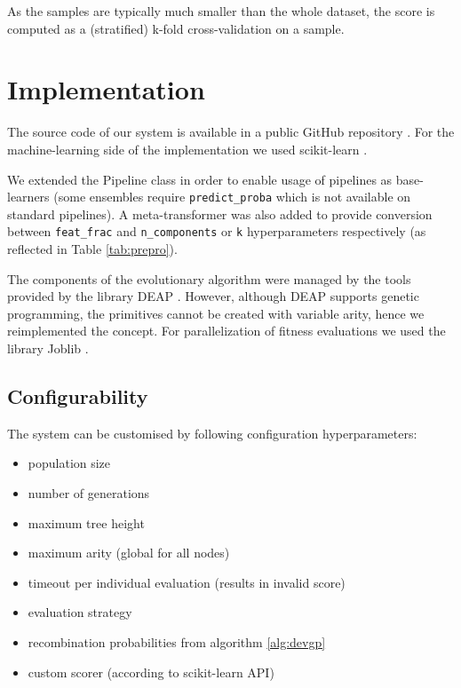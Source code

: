 As the samples are typically much smaller than the whole dataset, the score
is computed as a (stratified) k-fold cross-validation on a sample.
\section{Implementation} \label{genens:impl}
The source code of our system is available in a public GitHub repository
\citep{git_genens}.
For the machine-learning side of the implementation we used scikit-learn
\citep{scikit-learn}.

We extended the Pipeline class in order to enable usage
of pipelines as base-learners (some ensembles require \texttt{predict\_proba}
which is not available on standard pipelines). A meta-transformer was also
added to provide conversion between \texttt{feat\_frac} and 
\texttt{n\_components} or \texttt{k} hyperparameters respectively (as reflected
in Table \ref{tab:prepro}).

The components of the evolutionary algorithm were managed by the tools provided by
the library DEAP \citep{DEAP_JMLR2012}. However, although DEAP supports genetic
programming, the primitives cannot be created with variable arity, hence we
reimplemented the concept.
For parallelization of fitness evaluations we used the library Joblib
\citep{joblib}.


\subsection{Configurability}
The system can be customised by following configuration hyperparameters:

\begin{itemize}
\item population size
\item number of generations
\item maximum tree height
\item maximum arity (global for all nodes)
\item timeout per individual evaluation (results in invalid score)
\item evaluation strategy
\item recombination probabilities from algorithm \ref{alg:devgp}
\item custom scorer (according to scikit-learn API)
\end{itemize}



